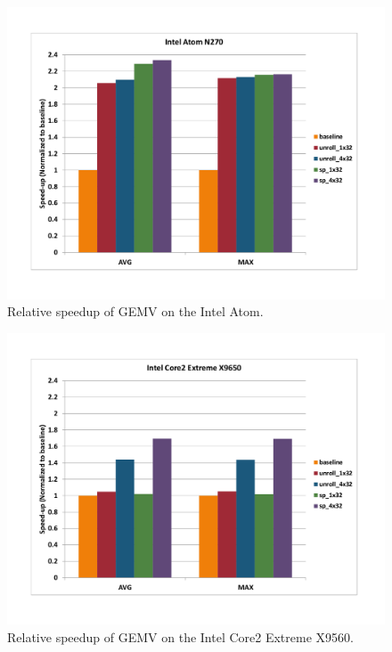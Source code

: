 \documentclass[10pt]{article}
\begin{document}
\begin{figure}[ht]
\begin{center}
\includegraphics[scale=.5]{gemv_atom.png}
\end{center}
\caption{Relative speedup of GEMV on the Intel Atom.}
\label{fig:gemv_atom}
\end{figure}

\begin{figure}[ht]
\begin{center}
\includegraphics[scale=.5]{gemv_core2_extreme_x9650.png}
\end{center}
\caption{Relative speedup of GEMV on the Intel Core2 Extreme X9560.}
\label{fig:gemv_core2}
\end{figure}
\end{document}
